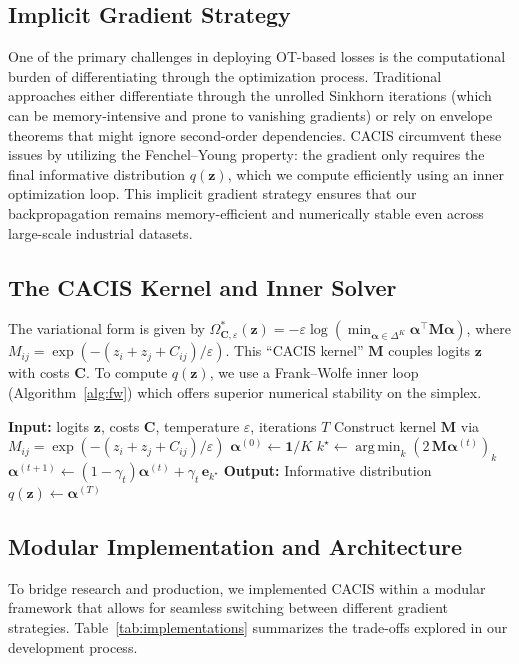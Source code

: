 \documentclass[sigconf,anonymous]{acmart}
\newcommand{\CACIS}{\textsc{CACIS}}
\newcommand{\vz}{\mathbf{z}}
\newcommand{\valpha}{\bm{\alpha}}
\newcommand{\mC}{\mathbf{C}}
\newcommand{\mM}{\mathbf{M}}
\newcommand{\vone}{\mathbf{1}}
\newcommand{\ve}{\mathbf{e}}
\DeclareMathOperator*{\argmin}{arg\,min}
\begin{document}
\subsection{Implicit Gradient Strategy}
One of the primary challenges in deploying OT-based losses is the computational burden of differentiating through the optimization process. Traditional approaches either differentiate through the unrolled Sinkhorn iterations (which can be memory-intensive and prone to vanishing gradients) or rely on envelope theorems that might ignore second-order dependencies. \CACIS{} circumvent these issues by utilizing the Fenchel--Young property: the gradient only requires the final informative distribution $q(\vz)$, which we compute efficiently using an inner optimization loop. This implicit gradient strategy ensures that our backpropagation remains memory-efficient and numerically stable even across large-scale industrial datasets.

\subsection{The CACIS Kernel and Inner Solver}
The variational form is given by $\Omega^*_{\mC, \varepsilon}(\vz) = -\varepsilon \log (\min_{\valpha \in \Delta^K} \valpha^\top \mM \valpha)$, where $M_{ij} = \exp(-(z_i + z_j + C_{ij})/\varepsilon)$. This ``CACIS kernel'' $\mM$ couples logits $\vz$ with costs $\mC$. To compute $q(\vz)$, we use a Frank--Wolfe inner loop (Algorithm~\ref{alg:fw}) which offers superior numerical stability on the simplex.

\begin{algorithm}[h]
\caption{Simplex-Stable Frank--Wolfe for \CACIS{}}
\label{alg:fw}
\begin{algorithmic}[1]
\STATE \textbf{Input:} logits $\vz$, costs $\mC$, temperature $\varepsilon$, iterations $T$
\STATE Construct kernel $\mM$ via $M_{ij} = \exp(-(z_i + z_j + C_{ij})/\varepsilon)$
\STATE $\valpha^{(0)} \leftarrow \vone/K$
    \STATE $k^\star \leftarrow \argmin_{k} (2\,\mM \valpha^{(t)})_k$
    \STATE $\valpha^{(t+1)} \leftarrow (1-\gamma_t)\valpha^{(t)} + \gamma_t\,\ve_{k^\star}$
\ENDFOR
\STATE \textbf{Output:} Informative distribution $q(\vz) \leftarrow \valpha^{(T)}$
\end{algorithmic}
\end{algorithm}

\subsection{Modular Implementation and Architecture}
To bridge research and production, we implemented \CACIS{} within a modular framework that allows for seamless switching between different gradient strategies. Table~\ref{tab:implementations} summarizes the trade-offs explored in our development process.
\end{document}
